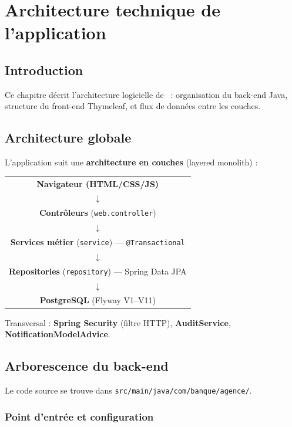 \chapter{Architecture technique de l'application}
\label{ch:archi}

\section{Introduction}

Ce chapitre décrit l'architecture logicielle de \nomapplication\ : organisation du back-end Java, structure du front-end Thymeleaf, et flux de données entre les couches.

\section{Architecture globale}

L'application suit une \textbf{architecture en couches} (layered monolith) :

\begin{center}
\begin{tabular}{c}
    \textbf{Navigateur (HTML/CSS/JS)} \\
    $\downarrow$ \\
    \textbf{Contrôleurs} (\texttt{web.controller}) \\
    $\downarrow$ \\
    \textbf{Services métier} (\texttt{service}) — \texttt{@Transactional} \\
    $\downarrow$ \\
    \textbf{Repositories} (\texttt{repository}) — Spring Data JPA \\
    $\downarrow$ \\
    \textbf{PostgreSQL} (Flyway V1--V11) \\
\end{tabular}
\end{center}

Transversal : \textbf{Spring Security} (filtre HTTP), \textbf{AuditService}, \textbf{NotificationModelAdvice}.

\section{Arborescence du back-end}

Le code source se trouve dans \texttt{src/main/java/com/banque/agence/}.

\subsection{Point d'entrée et configuration}

